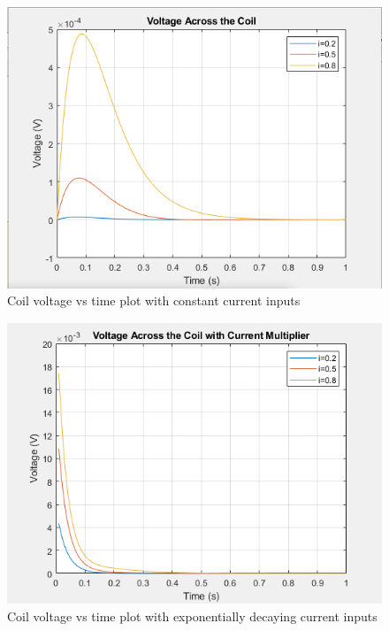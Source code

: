 \documentclass[conference]{IEEEtran}
\begin{document}
\begin{figure}[b]
    \begin{centering}
    \includegraphics[width=\linewidth]{q4_1.png}
    \caption{Coil voltage vs time plot with constant current inputs}
    \label{coil1}
    \end{centering}
\end{figure}

\begin{figure}[t]
    \begin{centering}
    \includegraphics[width=\linewidth]{q4_2_2.png}
    \caption{Coil voltage vs time plot with exponentially decaying current inputs}
    \label{coil2}
    \end{centering}
\end{figure}
\end{document}
